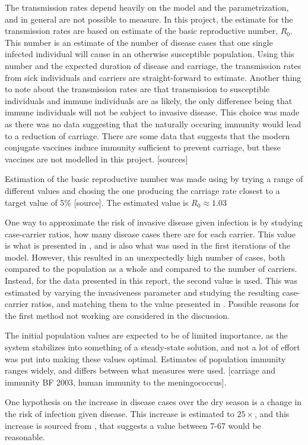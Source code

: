 \documentclass[10pt,a4paper]{article}
\begin{document}
The transmission rates depend heavily on the model and the parametrization, and in general are not possible to measure. In this project, the estimate for the transmission rates are based on estimate of the basic reproductive number, $R_0$. This number is an estimate of the number of disease cases that one single infected individual will cause in an otherwise susceptible population. Using this number and the expected duration of disease and carriage, the transmission rates from sick individuals and carriers are straight-forward to estimate. Another thing to note about the transmission rates are that transmission to susceptible individuals and immune individuals are as likely, the only difference being that immune individuals will not be subject to invasive disease. This choice was made as there was no data suggesting that the naturally occuring immunity would lead to a reduction of carriage. There are some data that suggests that the modern conjugate vaccines induce immunity sufficient to prevent carriage, but these vaccines are not modelled in this project. [sources]

Estimation of the basic reproductive number was made using by trying a range of different values and chosing the one producing the carriage rate closest to a target value of 5\% [source]. The estimated value is $R_0 \approx 1.03$

One way to approximate the risk of invasive disease given infection is by studying case-carrier ratios, how many disease cases there are for each carrier. This value is what is presented in \cite{clonal waves}, and is also what was used in the first iterations of the model. However, this resulted in an unexpectedly high number of cases, both compared to the population as a whole and compared to the number of carriers. Instead, for the data presented in this report, the second value is used. This was estimated by varying the invasiveness parameter and studying the resulting case-carrier ratios, and matching them to the value presented in \cite{clonalwaves}. Possible reasons for the first method not working are considered in the discussion.

The initial population values are expected to be of limited importance, as the system stabilizes into something of a steady-state solution, and not a lot of effort was put into making these values optimal. Estimates of population immunity ranges widely, and differs between what measures were used. [carriage and immunity BF 2003, human immunity to the meningococcus].

One hypothesis on the increase in disease cases over the dry season is a change in the risk of infection given disease. This increase is estimated to $25\times$, and this increase is sourced from \cite{mueller2010hypothetical}, that suggests a value between 7-67 would be reasonable.
\end{document}
